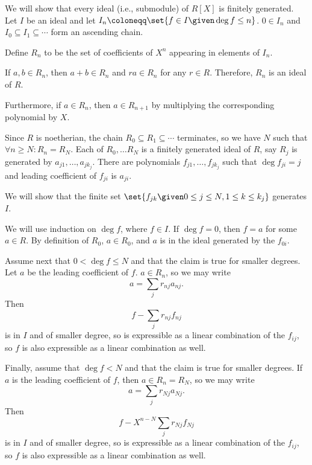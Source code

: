 We will show that every ideal (i.e., submodule) of $R[X]$ is finitely generated.
Let $I$ be an ideal and let $I_n\coloneqq \set{f \in I\given \deg f\leq n}$.
$0 \in I_n$ and $I_0 \subseteq I_1 \subseteq\cdots$ form an ascending chain.

Define $R_n$ to be the set of coefficients of $X^n$ appearing in elements of $I_n$.

If $a, b \in R_n$, then $a + b \in R_n$ and $ra \in R_n$ for any $r \in R$. Therefore,
$R_n$ is an ideal of $R$.

Furthermore, if $a \in R_n$, then $a \in R_{n + 1}$ by multiplying the corresponding
polynomial by $X$.

Since $R$ is noetherian, the chain $R_0 \subseteq R_1 \subseteq \cdots$ terminates,
so we have $N$ such that $\forall n\geq N\colon R_n = R_N$. Each of
$R_0, \ldots R_N$ is a finitely generated ideal of $R$, say $R_j$ is generated by
$a_{j1}, \ldots, a_{jk_j}$. There are polynomials $f_{j1}, \ldots, f_{jk_j}$
such that $\deg f_{ji} = j$ and leading coefficient of $f_{ji}$ is $a_{ji}$.

We will show that the finite set $\set{f_{jk}\given 0\leq j\leq N, 1\leq k\leq k_j}$
generates $I$.

We will use induction on $\deg f$, where $f \in I$. If $\deg f = 0$, then
$f = a$ for some $a \in R$. By definition of $R_0$, $a \in R_0$, and $a$ is
in the ideal generated by the $f_{0i}$.

Assume next that $0 < \deg f \leq N$ and that the claim is true for smaller degrees.
Let $a$ be the leading coefficient of $f$. $a \in R_n$, so we may write
\[ a = \sum_j r_{nj}a_{nj}. \] Then \[ f - \sum_j r_{nj}f_{nj} \] is in $I$ and of smaller
degree, so is expressible as a linear combination of the $f_{ij}$, so $f$ is also
expressible as a linear combination as well.

Finally, assume that $\deg f < N$ and that the claim is true for smaller degrees.
If $a$ is the leading coefficient of $f$, then $a \in R_n = R_N$, so we may write
\[ a = \sum_j r_{Nj}a_{Nj}. \] Then \[ f - X^{n-N} \sum_j r_{Nj}f_{Nj} \] is in $I$ and of smaller
degree, so is expressible as a linear combination of the $f_{ij}$, so $f$ is also
expressible as a linear combination as well.
